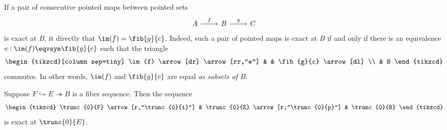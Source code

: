 \begin{rmk}
If a pair of consecutive pointed maps between pointed sets
\begin{equation*}
\begin{tikzcd}
A \arrow[r,"f"] & B \arrow[r,"g"] & C
\end{tikzcd}
\end{equation*}
is exact at $B$, it directly that $\im(f)=\fib{g}{c}$. Indeed, such a pair of pointed maps is exact at $B$ if and only if there is an equivalence $e:\im(f)\eqvsym \fib{g}{c}$ such that the triangle
\begin{equation*}
\begin{tikzcd}[column sep=tiny]
\im(f) \arrow[dr] \arrow[rr,"e"] & & \fib{g}{c} \arrow[dl] \\
& B
\end{tikzcd}
\end{equation*}
commutes. In other words, $\im(f)$ and $\fib{g}{c}$ are equal \emph{as subsets of $B$}.
\end{rmk}

\begin{lem}
Suppose $F\hookrightarrow E \twoheadrightarrow B$ is a fiber sequence. Then the sequence
\begin{equation*}
\begin{tikzcd}
\trunc{0}{F} \arrow[r,"\trunc{0}{i}"] & \trunc{0}{E} \arrow[r,"\trunc{0}{p}"] & \trunc{0}{B}
\end{tikzcd}
\end{equation*}
is exact at $\trunc{0}{E}$. 
\end{lem}

